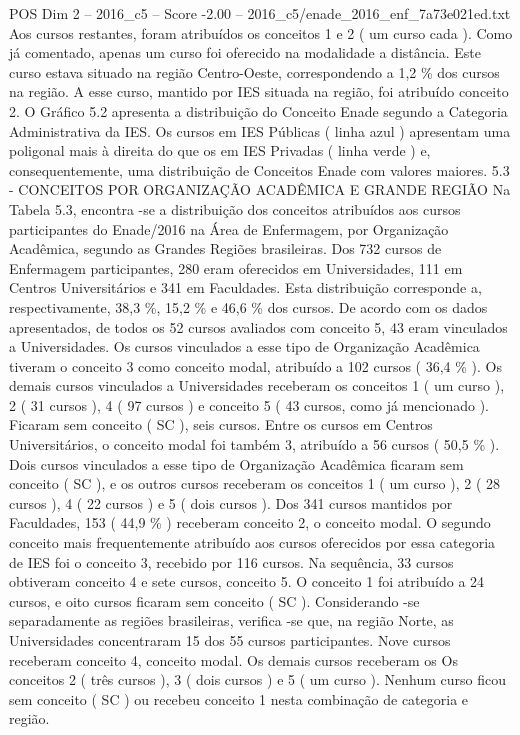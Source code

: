 \begin{textsample}{POS Dim 2 – 2016\_c5 – Score -2.00 – 2016\_c5/enade\_2016\_enf\_7a73e021ed.txt}
Aos cursos restantes, foram atribuídos os conceitos 1 e 2 ( um curso cada ).
Como já comentado, apenas um curso foi oferecido na modalidade a distância.
Este curso estava situado na região Centro-Oeste, correspondendo a 1,2 \% dos cursos na região.
A esse curso, mantido por IES situada na região, foi atribuído conceito 2.
O Gráfico 5.2 apresenta a distribuição do Conceito Enade segundo a Categoria Administrativa da IES.
Os cursos em IES Públicas ( linha azul ) apresentam uma poligonal mais à direita do que os em IES Privadas ( linha verde ) e, consequentemente, uma distribuição de Conceitos Enade com valores maiores. 5.3 - CONCEITOS POR ORGANIZAÇÃO ACADÊMICA E GRANDE REGIÃO Na Tabela 5.3, encontra -se a distribuição dos conceitos atribuídos aos cursos participantes do Enade/2016 na Área de Enfermagem, por Organização Acadêmica, segundo as Grandes Regiões brasileiras.
Dos 732 cursos de Enfermagem participantes, 280 eram oferecidos em Universidades, 111 em Centros Universitários e 341 em Faculdades.
Esta distribuição corresponde a, respectivamente, 38,3 \%, 15,2 \% e 46,6 \% dos cursos.
De acordo com os dados apresentados, de todos os 52 cursos avaliados com conceito 5, 43 eram vinculados a Universidades.
Os cursos vinculados a esse tipo de Organização Acadêmica tiveram o conceito 3 como conceito modal, atribuído a 102 cursos ( 36,4 \% ).
Os demais cursos vinculados a Universidades receberam os conceitos 1 ( um curso ), 2 ( 31 cursos ), 4 ( 97 cursos ) e conceito 5 ( 43 cursos, como já mencionado ).
Ficaram sem conceito ( SC ), seis cursos.
Entre os cursos em Centros Universitários, o conceito modal foi também 3, atribuído a 56 cursos ( 50,5 \% ).
Dois cursos vinculados a esse tipo de Organização Acadêmica ficaram sem conceito ( SC ), e os outros cursos receberam os conceitos 1 ( um curso ), 2 ( 28 cursos ), 4 ( 22 cursos ) e 5 ( dois cursos ).
Dos 341 cursos mantidos por Faculdades, 153 ( 44,9 \% ) receberam conceito 2, o conceito modal.
O segundo conceito mais frequentemente atribuído aos cursos oferecidos por essa categoria de IES foi o conceito 3, recebido por 116 cursos.
Na sequência, 33 cursos obtiveram conceito 4 e sete cursos, conceito 5.
O conceito 1 foi atribuído a 24 cursos, e oito cursos ficaram sem conceito ( SC ).
Considerando -se separadamente as regiões brasileiras, verifica -se que, na região Norte, as Universidades concentraram 15 dos 55 cursos participantes.
Nove cursos receberam conceito 4, conceito modal.
Os demais cursos receberam os Os conceitos 2 ( três cursos ), 3 ( dois cursos ) e 5 ( um curso ).
Nenhum curso ficou sem conceito ( SC ) ou recebeu conceito 1 nesta combinação de categoria e região.

\end{textsample}
